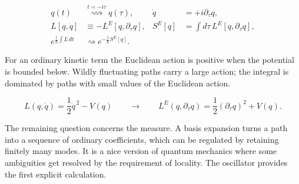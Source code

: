 \begin{align}
  q(t)&\mathrel{\overset{t=-i\tau}{\rightsquigarrow}}q(\tau),
  & \dot q&=+i\partial_\tau q,
  \label{eq:proposal-wick-map}\\
  L[q,\dot q]&\equiv-L^E[q,\partial_\tau q],
  & S^E[q]&=\int d\tau\,L^E[q,\partial_\tau q],
  \label{eq:proposal-euclidean-action-definition}\\
  e^{\frac{i}{\hbar}\int L\,dt}
  &\rightsquigarrow e^{-\frac{1}{\hbar}S^E[q]}.
  \label{eq:proposal-wick-weight}
\end{align}


For an ordinary kinetic term the Euclidean action is positive when the
potential is bounded below.  Wildly fluctuating paths carry a large action;
the integral is dominated by paths with small values of the Euclidean action.

\begin{equation}
  L(q,\dot q)=\frac12\dot q^{\,2}-V(q)
  \qquad\longrightarrow\qquad
  L^E(q,\partial_\tau q)
  =\frac12(\partial_\tau q)^2+V(q).
  \label{eq:proposal-euclidean-lagrangian}
\end{equation}

The remaining question concerns the measure.  A basis expansion turns a path
into a sequence of ordinary coefficients, which can be regulated by retaining
finitely many modes.  It is a nice version of quantum mechanics where some
ambiguities get resolved by the requirement of locality.  The oscillator
provides the first explicit calculation.

